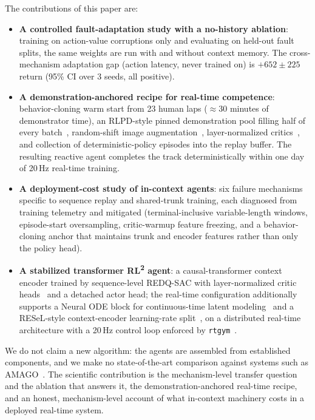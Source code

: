 \documentclass[conference]{IEEEtran}
\newcommand{\rltwo}{RL\textsuperscript{2}}
\begin{document}
The contributions of this paper are:

\begin{itemize}

    \item \textbf{A controlled fault-adaptation study with a no-history ablation}: training on action-value corruptions only and evaluating on held-out fault splits, the same weights are run with and without context memory. The cross-mechanism adaptation gap (action latency, never trained on) is $+652 \pm 225$ return (95\% CI over 3 seeds, all positive).

    \item \textbf{A demonstration-anchored recipe for real-time competence}: behavior-cloning warm start from 23 human laps ($\approx$30 minutes of demonstrator time), an RLPD-style pinned demonstration pool filling half of every batch~\cite{rlpd}, random-shift image augmentation~\cite{drq}, layer-normalized critics~\cite{droq}, and collection of deterministic-policy episodes into the replay buffer. The resulting reactive agent completes the track deterministically within one day of 20\,Hz real-time training.

    \item \textbf{A deployment-cost study of in-context agents}: six failure mechanisms specific to sequence replay and shared-trunk training, each diagnosed from training telemetry and mitigated (terminal-inclusive variable-length windows, episode-start oversampling, critic-warmup feature freezing, and a behavior-cloning anchor that maintains trunk and encoder features rather than only the policy head).

    \item \textbf{A stabilized transformer \rltwo{} agent}: a causal-transformer context encoder trained by sequence-level REDQ-SAC with layer-normalized critic heads~\cite{droq} and a detached actor head; the real-time configuration additionally supports a Neural ODE block for continuous-time latent modeling~\cite{neuralode} and a RESeL-style context-encoder learning-rate split~\cite{resel}, on a distributed real-time architecture with a 20\,Hz control loop enforced by \texttt{rtgym}~\cite{rtgym,tmrl}.

\end{itemize}



We do not claim a new algorithm: the agents are assembled from established components, and we make no state-of-the-art comparison against systems such as AMAGO~\cite{amago}. The scientific contribution is the mechanism-level transfer question and the ablation that answers it, the demonstration-anchored real-time recipe, and an honest, mechanism-level account of what in-context machinery costs in a deployed real-time system.
\end{document}
